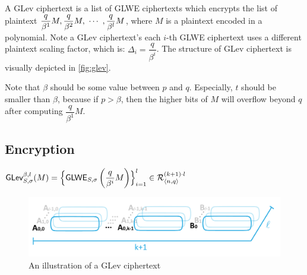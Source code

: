 A GLev ciphertext is a list of GLWE ciphertexts which encrypts the list of plaintext $\dfrac{q}{\beta^1}M, \dfrac{q}{\beta^2}M, \text{ } \text{$\cdots$} \text{ }, \dfrac{q}{\beta^l}M$, where $M$ is a plaintext encoded in a polynomial. Note  a GLev ciphertext's each $i$-th GLWE ciphertext uses a different plaintext scaling factor, which is: $\Delta_i = \dfrac{q}{\beta^i}$. The structure of GLev ciphertext is visually depicted in \autoref{fig:glev}.

Note that $\beta$ should be some value between $p$ and $q$.
Especially, $t$ should be smaller than $\beta$, because if $p > \beta$, then the higher bits of $M$ will overflow beyond $q$ after computing $\dfrac{q}{\beta^1}M$. 

\subsection{Encryption}
\label{subsec:glev-enc}

\begin{tcolorbox}[title={\textbf{\tboxlabel{\ref*{subsec:glev-enc}} GLev Encryption}}]


$\textsf{GLev}_{S, \sigma}^{\beta, l}(M) = \Bigl \{\textsf{GLWE}_{S, \sigma}\left(\dfrac{q}{\beta^i} M\right)  \Bigr \}_{i=1}^{l} \in \mathcal{R}_{\langle n, q \rangle }^{(k+1) \cdot l}$
\end{tcolorbox}

\begin{figure}[h!]
    \centering
  \includegraphics[width=1.0\linewidth]{figures/TFHE-fig2.pdf}
  \caption{An illustration of a GLev ciphertext }
  \label{fig:glev}
\end{figure}


